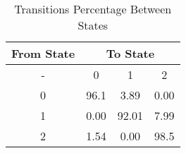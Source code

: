 \documentclass[a4paper,11pt]{article}
\begin{document}
\begin{table}[!hbp]
    \centering
    \caption{Transitions Percentage Between States }
    \vspace{0.5cm}
    \begin{tabular}{|c|c c c|}
        \hline
        \textbf{From State} & \multicolumn{3}{c|}{\textbf{To State}} \\
        \hline
        - & 0 & 1 & 2 \\
        \hline
        0 & 96.1 & 3.89 & 0.00 \\
        1 & 0.00 & 92.01 & 7.99 \\
        2 & 1.54 & 0.00 & 98.5 \\
        \hline
    \end{tabular}
    \label{transitions}
\end{table}
\end{document}
